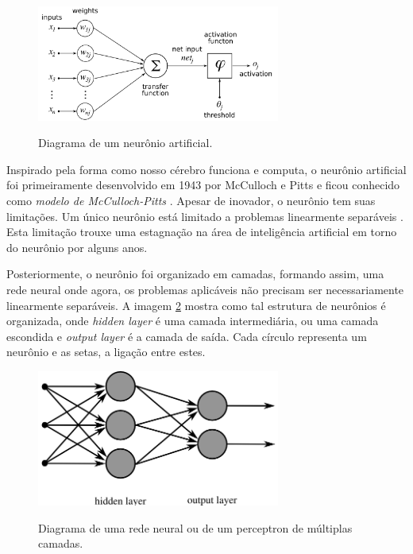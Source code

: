 \begin{figure}[H]
    \centering
    \caption{Diagrama de um neurônio artificial.}
    \includegraphics[width=8cm]{fig/ArtificialNeuronModel.png}
    \label{fig:fig1}
\end{figure}

Inspirado pela forma como nosso cérebro funciona e computa, o neurônio artificial foi primeiramente desenvolvido em 1943 por McCulloch e Pitts e ficou conhecido como \textit{modelo de McCulloch-Pitts} \cite{mcculloch_logical_1943}. Apesar de inovador, o neurônio tem suas limitações. Um único neurônio está limitado a problemas linearmente separáveis \cite{haykin_redes_2007}. Esta limitação trouxe uma estagnação na área de inteligência artificial em torno do neurônio por alguns anos. 

Posteriormente, o neurônio foi organizado em camadas, formando assim, uma rede neural onde agora, os problemas aplicáveis não precisam ser necessariamente linearmente separáveis. A imagem \ref{fig:fig2} mostra como tal estrutura de neurônios é organizada, onde \textit{hidden layer} é uma camada intermediária, ou uma camada escondida e \textit{output layer} é a camada de saída. Cada círculo representa um neurônio e as setas, a ligação entre estes.

\begin{figure}[H]
    \centering
    \caption{Diagrama de uma rede neural ou de um perceptron de múltiplas camadas.}
    \includegraphics[width=8cm]{fig/MultiLayerNeuralNetwork_english.png}
    \label{fig:fig2}
\end{figure}


